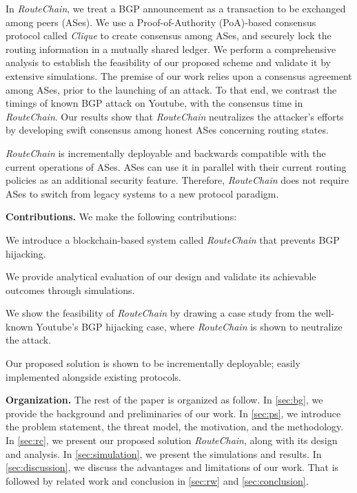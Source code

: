 \documentclass[conference]{IEEEtran}
\newcommand{\BfPara}[1]{{\noindent\bf#1.}\xspace}
\newcommand{\rc}{{{\em RouteChain}}\xspace}
\begin{document}
In \rc, we treat a BGP announcement as a transaction to be exchanged among peers (ASes). We use a Proof-of-Authority (PoA)-based consensus protocol called {\em Clique} \cite{Angelis18} to create consensus among ASes, and securely lock the routing information in a mutually shared ledger. We perform a comprehensive analysis to establish the feasibility of our proposed scheme and validate it by extensive simulations. The premise of our work relies upon a consensus agreement among ASes, prior to the launching of an attack. To that end, we contrast the timings of known BGP attack on Youtube, with the consensus time in \rc. Our results show that \rc neutralizes the attacker's efforts by developing swift consensus among honest ASes concerning routing states.%

 \rc is incrementally deployable and backwards compatible with the current operations of ASes. ASes can use it in parallel with their current routing policies as an additional security feature. Therefore, \rc does not require ASes to switch from legacy systems to a new protocol paradigm. 


\BfPara{Contributions} We make the following contributions:
\begin{enumerate*}
    \item We introduce a blockchain-based system called \rc that prevents BGP hijacking.
    \item We provide analytical evaluation of our design and validate its achievable outcomes through simulations. 
    \item We show the feasibility of \rc by drawing a case study from the well-known Youtube's BGP hijacking case, where \rc is shown to neutralize the attack.  
    \item Our proposed solution is shown to be incrementally deployable; easily implemented alongside existing protocols. 
\end{enumerate*}

\BfPara{Organization} The rest of the paper is organized as follow. In \textsection\ref{sec:bg}, we provide the background and preliminaries of our work. In \textsection\ref{sec:ps}, we introduce the problem statement, the threat model, the motivation, and the methodology. In \textsection\ref{sec:rc}, we present our proposed solution \rc, along with its design and analysis. In \textsection\ref{sec:simulation}, we present the simulations and results. In \textsection\ref{sec:discussion}, we discuss the advantages and limitations of our work. That is followed by related work and conclusion in \textsection\ref{sec:rw} and \textsection\ref{sec:conclusion}.  
\end{document}
